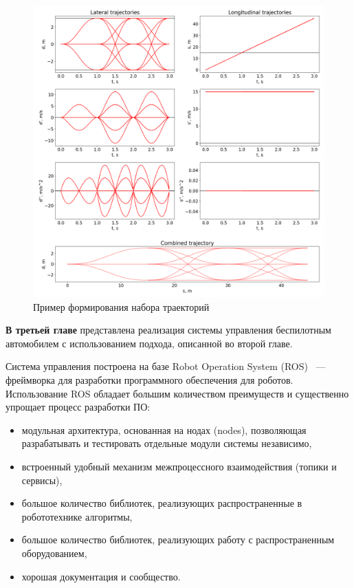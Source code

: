 \begin{figure}[h]
    \centering
    \includegraphics[width=\linewidth]{images/2_project/quintic_2/multistep_trajectories}
          \caption{Пример формирования набора траекторий}
    \label{img:multistep_trajectories}
\end{figure}

\textbf{В третьей главе} представлена реализация системы управления беспилотным автомобилем с
использованием подхода, описанной во второй главе.

Система управления построена на базе Robot Operation System (ROS) ~--- фреймворка для разработки
программного обеспечения для роботов. Использование ROS обладает большим количеством преимуществ
и существенно упрощает процесс разработки ПО:
\begin{itemize}
    \item модульная архитектура, основанная на нодах (nodes), позволяющая разрабатывать
          и тестировать отдельные модули системы независимо,
    \item встроенный удобный механизм межпроцессного взаимодействия (топики и сервисы),
    \item большое количество библиотек, реализующих распространенные в робототехнике алгоритмы,
    \item большое количество библиотек, реализующих работу с распространенным оборудованием,
    \item хорошая документация и сообщество.
\end{itemize}


